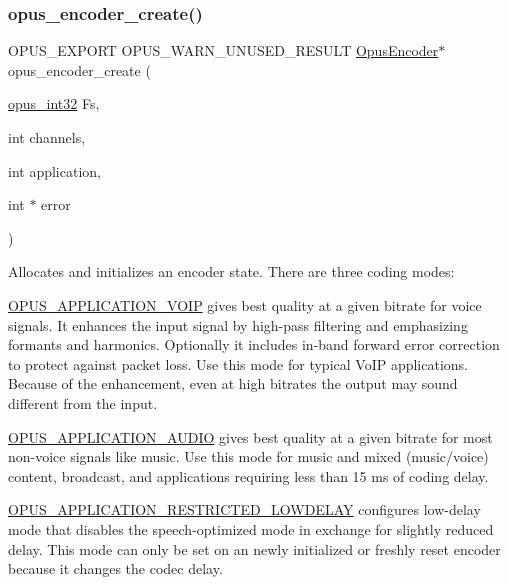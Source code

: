 \subsubsection{\texorpdfstring{opus\+\_\+encoder\+\_\+create()}{opus\_encoder\_create()}}
{\footnotesize\ttfamily O\+P\+U\+S\+\_\+\+E\+X\+P\+O\+RT O\+P\+U\+S\+\_\+\+W\+A\+R\+N\+\_\+\+U\+N\+U\+S\+E\+D\+\_\+\+R\+E\+S\+U\+LT \hyperlink{group__opus__encoder_gaf461a3ef2f10c2fe8b994a176f06c9bd}{Opus\+Encoder}$\ast$ opus\+\_\+encoder\+\_\+create (\begin{DoxyParamCaption}\item[{\hyperlink{opus__types_8h_aa4d309d6f80b99dbabebc8f98879ab9a}{opus\+\_\+int32}}]{Fs,  }\item[{int}]{channels,  }\item[{int}]{application,  }\item[{int $\ast$}]{error }\end{DoxyParamCaption})}

Allocates and initializes an encoder state. There are three coding modes\+:

\hyperlink{group__opus__ctlvalues_ga07884aa018303a419d1f7acb2f3fa669}{O\+P\+U\+S\+\_\+\+A\+P\+P\+L\+I\+C\+A\+T\+I\+O\+N\+\_\+\+V\+O\+IP} gives best quality at a given bitrate for voice signals. It enhances the input signal by high-\/pass filtering and emphasizing formants and harmonics. Optionally it includes in-\/band forward error correction to protect against packet loss. Use this mode for typical Vo\+IP applications. Because of the enhancement, even at high bitrates the output may sound different from the input.

\hyperlink{group__opus__ctlvalues_ga5909f7cb35c04f1110026c6889edd345}{O\+P\+U\+S\+\_\+\+A\+P\+P\+L\+I\+C\+A\+T\+I\+O\+N\+\_\+\+A\+U\+D\+IO} gives best quality at a given bitrate for most non-\/voice signals like music. Use this mode for music and mixed (music/voice) content, broadcast, and applications requiring less than 15 ms of coding delay.

\hyperlink{group__opus__ctlvalues_ga592232fb39db60c1369989c5c5d19a07}{O\+P\+U\+S\+\_\+\+A\+P\+P\+L\+I\+C\+A\+T\+I\+O\+N\+\_\+\+R\+E\+S\+T\+R\+I\+C\+T\+E\+D\+\_\+\+L\+O\+W\+D\+E\+L\+AY} configures low-\/delay mode that disables the speech-\/optimized mode in exchange for slightly reduced delay. This mode can only be set on an newly initialized or freshly reset encoder because it changes the codec delay.

